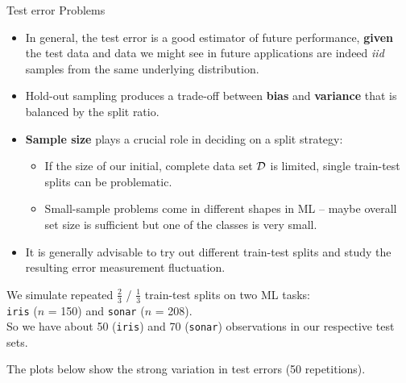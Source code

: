 \documentclass[11pt,compress,t,notes=noshow, xcolor=table]{beamer}
\begin{document}

\begin{vbframe}{Test error Problems}

\begin{itemize}
  \item In general, the test error is a good estimator of future performance,
  \textbf{given} the test data and data we might see in future applications are 
  indeed \textit{iid} samples from the same underlying distribution.
  \item Hold-out sampling produces a trade-off between \textbf{bias} and
  \textbf{variance} that is balanced by the split ratio.
  \item \textbf{Sample size} plays a crucial role in deciding on a split 
  strategy:
  \begin{itemize}
    \item If the size of our initial, complete data set $\mathcal{D}$ is limited,
    single train-test splits can be problematic.
    \item Small-sample problems come in different shapes in ML -- 
    maybe overall set size is sufficient but one of the classes is very small.
  \end{itemize}
  \item It is generally advisable to try out different train-test splits and 
  study the resulting error measurement fluctuation.
\end{itemize}

\framebreak

We simulate repeated $\tfrac{2}{3}$ / $\tfrac{1}{3}$ train-test splits on two ML 
tasks:\\ 
\texttt{iris} ($n$ = 150) and \texttt{sonar} ($n$ = 208).\\
So we have about 50 (\texttt{iris}) and 70 (\texttt{sonar}) observations in our 
respective test sets.\\

\vfill

The plots below show the strong variation in test errors (50 
repetitions).

\vfill


\end{vbframe}
\end{document}
